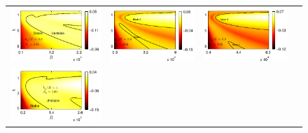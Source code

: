 \documentclass[aps,prl,twocolumn,superscriptaddress,10pt]{revtex4-1}  %
\begin{document}
\begin{figure}
\begin{tabular}{cccc}
{\includegraphics[scale = 0.95]{Set4_dens28_imgsc}} &
{\includegraphics[scale = 0.95]{Set4_dens32_imgsc}} &
{\includegraphics[scale = 0.95]{Set4_dens34_imgsc}} \\
{\includegraphics[scale = 0.95]{Set5_dens38_imgsc}} &

\end{tabular}
\end{figure}
\end{document}
